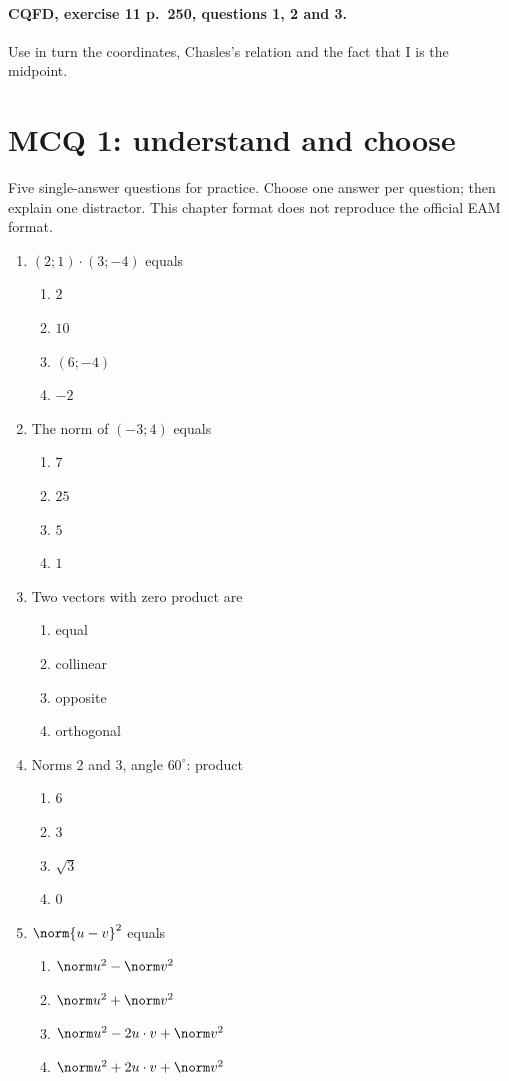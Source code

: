 \paragraph{CQFD, exercise 11 p.~250, questions 1, 2 and 3.}\label{C03-M2} Use in turn the coordinates, Chasles's relation and the fact that I is the midpoint.
\begingroup\small
\clearpage\section*{MCQ 1: understand and choose}\label{C03-Q1}
Five single-answer questions for practice. Choose one answer per question; then explain one distractor. This chapter format does not reproduce the official EAM format.
\begin{enumerate}
\item $(2;1)\cdot(3;-4)$ equals
\begin{enumerate}[label=\Alph*.,itemsep=2pt]
\item $2$
\item $10$
\item $(6;-4)$
\item $-2$
\end{enumerate}
\item The norm of $(-3;4)$ equals
\begin{enumerate}[label=\Alph*.,itemsep=2pt]
\item $7$
\item $25$
\item $5$
\item $1$
\end{enumerate}
\item Two vectors with zero product are
\begin{enumerate}[label=\Alph*.,itemsep=2pt]
\item equal
\item collinear
\item opposite
\item orthogonal
\end{enumerate}
\item Norms 2 and 3, angle $60^\circ$: product
\begin{enumerate}[label=\Alph*.,itemsep=2pt]
\item $6$
\item $3$
\item $\sqrt3$
\item $0$
\end{enumerate}
\item $\norm{u-v}^2$ equals
\begin{enumerate}[label=\Alph*.,itemsep=2pt]
\item $\norm u^2-\norm v^2$
\item $\norm u^2+\norm v^2$
\item $\norm u^2-2u\cdot v+\norm v^2$
\item $\norm u^2+2u\cdot v+\norm v^2$
\end{enumerate}
\end{enumerate}
